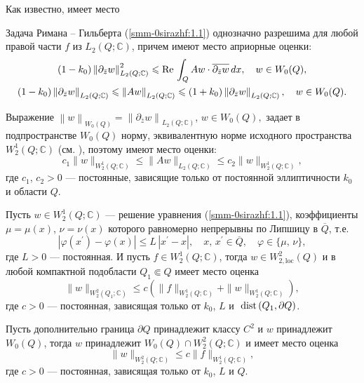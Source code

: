 Как известно, имеет место

\begin{theorem}\label{smm2-th1}
 Задача Римана -- Гильберта {(\ref{smm-0sirazhf:1.1})} однозначно разрешима для любой правой части $f$ из $L_2(Q;\mathbb{C})$,
	причем имеют место априорные оценки:
\begin{gather}\label{smm-0sirazhf:1.3}
	(1-k_0)\left\|\partial_{\bar{z}}w\right\|^2_{L_2(Q;\mathbb{C})}\leqslant \text{Re\,} \int_{Q} Aw\cdot \overline{\partial_{\bar{z}}w}\,dx,\quad w\in W_0(Q),\\
	\label{smm-0sirazhf:1.4}
	(1-k_0)\left\|\partial_{\bar{z}}w\right\|_{L_2(Q;\mathbb{C})}\leqslant \left\| Aw\right\|_{L_2(Q;\mathbb{C})} \leqslant
	(1+k_0)\left\|\partial_{\bar{z}}w\right\|_{L_2(Q;\mathbb{C})}, \quad w\in W_0(Q).
\end{gather}
\end{theorem}
Выражение
$
\left\| w\right\|_{W_0(Q)}=\left\| \partial_{\bar{z}}w\right\|_{L_2(Q;\mathbb{C})}$, $w\in W_0(Q),
$
задает в подпространстве $W_0(Q)$ норму, эквивалентную норме исходного пространства $W_2^1(Q;\mathbb{C})$ (см.  \cite{smm-12, smm-13}),
поэтому имеют место оценки:
\begin{equation}\label{smm-0sirazhf:1.5}
	c_1\|w\|_{W^1_2(Q;\mathbb{C})}\leqslant\|Aw\|_{L_2(Q;\mathbb{C})}\leqslant c_2 \|w\|_{W^1_2(Q;\mathbb{C})},
\end{equation}
где $c_1$, $c_2>0$ --- постоянные, зависящие только от постоянной эллиптичности $k_0$ и области $Q$.

\begin{theorem}\label{smm2-th2} Пусть $w\in W_2^1(Q;\mathbb{C})$ --- решение уравнения  {(\ref{smm-0sirazhf:1.1})}, коэффициенты $\mu=\mu(x)$, $\nu=\nu(x)$ которого равномерно непрерывны по Липшицу в $\overline Q$, т.е.
	$$
	|\varphi(x^\prime)-\varphi(x)|\leqslant L\,|x^\prime-x|,\quad x,\,x^\prime\in \overline{Q},\quad \varphi\in\{\mu,\,\nu\},
	$$
	где $L>0$ --- постоянная. И пусть  $f\in W_2^1(Q;\mathbb{C})$, тогда $w\in W_{2,\text{loc}}^2(Q)$ и в любой компактной подобласти $Q_1\Subset Q$ имеет место оценка
	\begin{equation}\label{smm-0sirazhf:1.6_1}
		\|w\|_{W^2_2(Q_1; \mathbb{C})}\leqslant c\left(\|f\|_{W^1_2(Q; \mathbb{C})}+\|w\|_{W^1_2(Q; \mathbb{C})}\right),
	\end{equation}
	где $c>0$ --- постоянная, зависящая только от $k_0$, $L$ и $\text{ dist\,}(Q_1,\partial Q)$.


Пусть дополнительно граница $\partial Q$ принадлежит классу $C^2$ и $w$ принадлежит $W_0(Q)$, тогда $w$ принадлежит $W_0(Q)\cap W_2^2(Q; \mathbb{C})$ и имеет место оценка
\begin{equation}\label{smm-0sirazhf:1.6_2}
	\|w\|_{W^2_2(Q; \mathbb{C})}\leqslant c\|f\|_{W^1_2(Q; \mathbb{C})},
\end{equation}
где $c>0$ --- постоянная, зависящая только от $k_0$, $L$ и $Q$.
\end{theorem}

